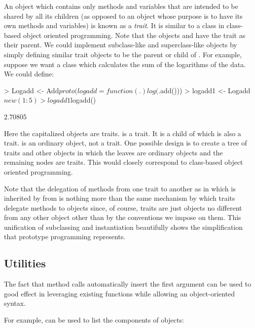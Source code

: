 \documentclass{Z}
\begin{document}
An object which contains only methods and variables that are
intended to be shared by all its children (as opposed to an
object whose purpose is to have its own methods and variables)
is known as a \emph{trait}.  It is similar to a class in class-based
object oriented programming.   
Note that the objects  and  have the trait
 as their parent.  We could implement subclass-like and
superclass-like objects by simply defining similar trait objects to 
be the parent or child of .  For example, suppose we
want a class which calculates the sum of the logarithms of the data.  We
could define:

\begin{Schunk}
\begin{Sinput}
> Logadd <- Add$proto(logadd = function(.) log(.$add()))
> logadd1 <- Logadd$new(1:5)
> logadd1$logadd()
\end{Sinput}
\begin{Soutput}
[1] 2.70805
\end{Soutput}
\end{Schunk}

Here the capitalized objects are traits.
 is a trait.  It is a child of 
which is also a trait.   is an ordinary object,
not a trait.
One possible design is to create a tree of traits and other objects
in which the leaves are ordinary objects and the remaining nodes
are traits.  This would closely correspond to class-based
object oriented programming.  

Note that the delegation of methods from
one trait to another as in
 which is inherited by  from 
is nothing more than the same mechanism by which traits delegate
methods to
objects since, of course, traits are just objects no different
from any other object other than by the conventions we impose on them.
This unification of subclassing and instantiation beautifully
shows the simplification that prototype programming represents.

\subsection{Utilities}
\label{sec:utilities}
The fact that method calls automatically insert the first argument
can be used to good effect in leveraging existing 
functions while allowing an object-oriented syntax.

For example,  can be used to list the components of
 objects:
\end{document}
